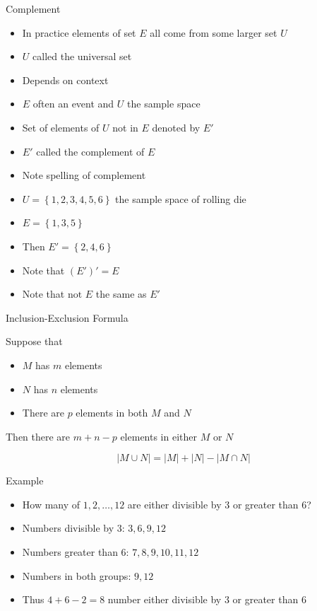\documentclass{beamer}
\theoremstyle{definition}
\begin{document}
\begin{frame}{Complement}
\begin{itemize}
\item In practice elements of set $E$ all come from
some larger set $U$
\item $U$ called the \alert{universal set}
\item Depends on context
\item $E$ often an event and $U$ the sample space
\item Set of elements of $U$ not in $E$ denoted by $E'$
\item $E'$ called the \alert{complement} of $E$
\item Note spelling of \alert{complement}
\end{itemize}
\begin{example}
\begin{itemize}
\item $U=\left\{1,2,3,4,5,6\right\}$ the sample
space of rolling die
\item $E=\left\{1,3,5\right\}$
\item Then $E'=\left\{2,4,6\right\}$
\item Note that $\left(E'\right)'=E$
\item Note that \alert{$\text{not $E$}$}
the same as $E'$
\end{itemize}
\end{example}
\end{frame}

\begin{frame}{Inclusion-Exclusion Formula}
\begin{theorem}
Suppose that
\begin{itemize}
\item $M$ has $m$ elements 
\item $N$ has $n$ elements
\item There are $p$ elements in \alert{both} $M$ and $N$
\end{itemize}
Then there are $m+n-p$ elements in \alert{either} $M$ or $N$
\end{theorem}
\begin{theorem}
\[\left|M\cup N\right|=\left|M\right|
+\left|N\right|-\left|M\cap N\right|\]
\end{theorem}
\end{frame}

\begin{frame}{Example}
\begin{itemize}
\item How many of $1,2,\ldots,12$ are
either divisible by $3$ or greater than $6$?
\item Numbers divisible by $3$: $3,6,9,12$
\item Numbers greater than $6$: $7,8,9,10,11,12$
\item Numbers in both groups: $9,12$
\item Thus $4+6-2=8$ number
either divisible by $3$ or greater than $6$
\end{itemize}
\end{frame}
\end{document}
